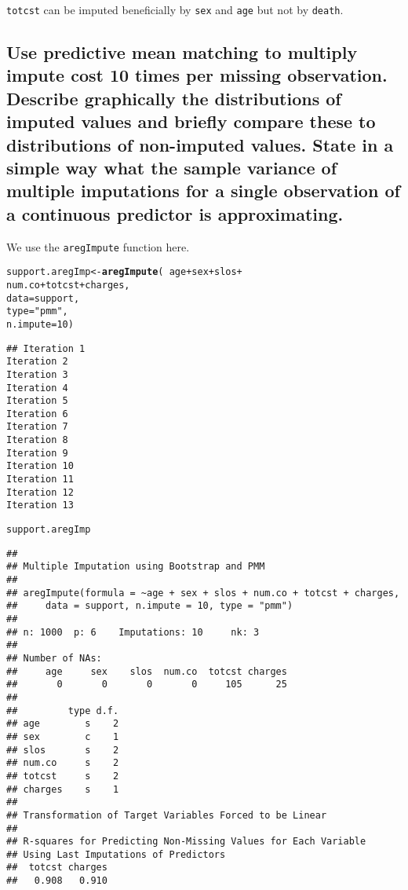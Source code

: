 \documentclass[headinclude=true, headsepline=true, DIV14]{scrartcl}\usepackage[]{graphicx}\usepackage[]{color}
\makeatletter
\newcommand{\hlnum}[1]{\textcolor[rgb]{0.686,0.059,0.569}{#1}}%
\newcommand{\hlstr}[1]{\textcolor[rgb]{0.192,0.494,0.8}{#1}}%
\newcommand{\hlopt}[1]{\textcolor[rgb]{0,0,0}{#1}}%
\newcommand{\hlstd}[1]{\textcolor[rgb]{0.345,0.345,0.345}{#1}}%
\newcommand{\hlkwb}[1]{\textcolor[rgb]{0.69,0.353,0.396}{#1}}%
\newcommand{\hlkwc}[1]{\textcolor[rgb]{0.333,0.667,0.333}{#1}}%
\newcommand{\hlkwd}[1]{\textcolor[rgb]{0.737,0.353,0.396}{\textbf{#1}}}%
\newenvironment{kframe}{%
 \def\at@end@of@kframe{}%
 \ifinner\ifhmode%
  \def\at@end@of@kframe{\end{minipage}}%
  \begin{minipage}{\columnwidth}%
 \fi\fi%
 \def\FrameCommand##1{\hskip\@totalleftmargin \hskip-\fboxsep
 \colorbox{shadecolor}{##1}\hskip-\fboxsep
     \hskip-\linewidth \hskip-\@totalleftmargin \hskip\columnwidth}%
 \MakeFramed {\advance\hsize-\width
   \@totalleftmargin\z@ \linewidth\hsize
   \@setminipage}}%
 {\par\unskip\endMakeFramed%
 \at@end@of@kframe}
\newenvironment{knitrout}{}{} %
\makeatother
\begin{document}
\texttt{totcst} can be imputed beneficially by \texttt{sex} and \texttt{age} but
not by \texttt{death}.

\subsection{Use predictive mean matching to multiply impute cost 10 times per missing
observation. Describe graphically the distributions of imputed values and
briefly compare these to distributions of non-imputed values. State in a simple 
way what the sample variance of multiple imputations for a single
observation of a continuous predictor is approximating.}

We use the \texttt{aregImpute} function here.

\begin{knitrout}
\color{fgcolor}\begin{kframe}
\begin{alltt}
\hlstd{support.aregImp} \hlkwb{<-} \hlkwd{aregImpute}\hlstd{(}\hlopt{~} \hlstd{age} \hlopt{+} \hlstd{sex} \hlopt{+} \hlstd{slos} \hlopt{+}
                                \hlstd{num.co} \hlopt{+} \hlstd{totcst} \hlopt{+} \hlstd{charges,}
                              \hlkwc{data} \hlstd{= support,}
                              \hlkwc{type} \hlstd{=} \hlstr{"pmm"}\hlstd{,}
                              \hlkwc{n.impute} \hlstd{=} \hlnum{10}\hlstd{)}
\end{alltt}
\begin{verbatim}
## Iteration 1 
Iteration 2 
Iteration 3 
Iteration 4 
Iteration 5 
Iteration 6 
Iteration 7 
Iteration 8 
Iteration 9 
Iteration 10 
Iteration 11 
Iteration 12 
Iteration 13 

\end{verbatim}
\begin{alltt}
\hlstd{support.aregImp}
\end{alltt}
\begin{verbatim}
## 
## Multiple Imputation using Bootstrap and PMM
## 
## aregImpute(formula = ~age + sex + slos + num.co + totcst + charges, 
##     data = support, n.impute = 10, type = "pmm")
## 
## n: 1000 	p: 6 	Imputations: 10  	nk: 3 
## 
## Number of NAs:
##     age     sex    slos  num.co  totcst charges 
##       0       0       0       0     105      25 
## 
##         type d.f.
## age        s    2
## sex        c    1
## slos       s    2
## num.co     s    2
## totcst     s    2
## charges    s    1
## 
## Transformation of Target Variables Forced to be Linear
## 
## R-squares for Predicting Non-Missing Values for Each Variable
## Using Last Imputations of Predictors
##  totcst charges 
##   0.908   0.910
\end{verbatim}
\end{kframe}
\end{knitrout}
\end{document}
